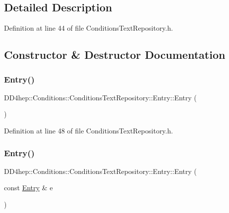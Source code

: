 \subsection{Detailed Description}


Definition at line 44 of file Conditions\+Text\+Repository.\+h.



\subsection{Constructor \& Destructor Documentation}
\hypertarget{class_d_d4hep_1_1_conditions_1_1_conditions_text_repository_1_1_entry_a9146bcb872abe9741774c1c6b967fac7}{}\label{class_d_d4hep_1_1_conditions_1_1_conditions_text_repository_1_1_entry_a9146bcb872abe9741774c1c6b967fac7} 
\subsubsection{\texorpdfstring{Entry()}{Entry()}\hspace{0.1cm}{\footnotesize\ttfamily [1/2]}}
{\footnotesize\ttfamily D\+D4hep\+::\+Conditions\+::\+Conditions\+Text\+Repository\+::\+Entry\+::\+Entry (\begin{DoxyParamCaption}{ }\end{DoxyParamCaption})\hspace{0.3cm}{\ttfamily [inline]}}



Definition at line 48 of file Conditions\+Text\+Repository.\+h.

\hypertarget{class_d_d4hep_1_1_conditions_1_1_conditions_text_repository_1_1_entry_afe8a21e97ecbe0686508a5bf5b847f43}{}\label{class_d_d4hep_1_1_conditions_1_1_conditions_text_repository_1_1_entry_afe8a21e97ecbe0686508a5bf5b847f43} 
\subsubsection{\texorpdfstring{Entry()}{Entry()}\hspace{0.1cm}{\footnotesize\ttfamily [2/2]}}
{\footnotesize\ttfamily D\+D4hep\+::\+Conditions\+::\+Conditions\+Text\+Repository\+::\+Entry\+::\+Entry (\begin{DoxyParamCaption}\item[{const \hyperlink{class_d_d4hep_1_1_conditions_1_1_conditions_text_repository_1_1_entry}{Entry} \&}]{e }\end{DoxyParamCaption})\hspace{0.3cm}{\ttfamily [inline]}}



